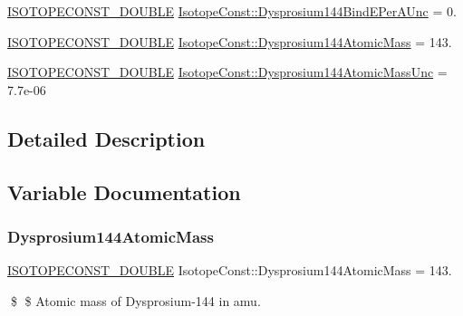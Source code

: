 \begin{DoxyCompactItemize}
\item 
\mbox{\hyperlink{group___isotope_const-_macros_ga8f45a7272ce02c0b4c65c44636ed719a}{I\+S\+O\+T\+O\+P\+E\+C\+O\+N\+S\+T\+\_\+\+D\+O\+U\+B\+LE}} \mbox{\hyperlink{group___isotope_const-_dysprosium-_dy144_gaa909bf4526c4543c20768688331f880a}{Isotope\+Const\+::\+Dysprosium144\+Bind\+E\+Per\+A\+Unc}} = 0.
\item 
\mbox{\hyperlink{group___isotope_const-_macros_ga8f45a7272ce02c0b4c65c44636ed719a}{I\+S\+O\+T\+O\+P\+E\+C\+O\+N\+S\+T\+\_\+\+D\+O\+U\+B\+LE}} \mbox{\hyperlink{group___isotope_const-_dysprosium-_dy144_gaa549cde5e767f696c38f311d13b79605}{Isotope\+Const\+::\+Dysprosium144\+Atomic\+Mass}} = 143.
\item 
\mbox{\hyperlink{group___isotope_const-_macros_ga8f45a7272ce02c0b4c65c44636ed719a}{I\+S\+O\+T\+O\+P\+E\+C\+O\+N\+S\+T\+\_\+\+D\+O\+U\+B\+LE}} \mbox{\hyperlink{group___isotope_const-_dysprosium-_dy144_ga456d8966d891aa4ee8eb29a285295bd0}{Isotope\+Const\+::\+Dysprosium144\+Atomic\+Mass\+Unc}} = 7.\+7e-\/06
\end{DoxyCompactItemize}


\subsection{Detailed Description}


\subsection{Variable Documentation}
\mbox{\label{group___isotope_const-_dysprosium-_dy144_gaa549cde5e767f696c38f311d13b79605}} 
\subsubsection{\texorpdfstring{Dysprosium144\+Atomic\+Mass}{Dysprosium144AtomicMass}}
{\footnotesize\ttfamily \mbox{\hyperlink{group___isotope_const-_macros_ga8f45a7272ce02c0b4c65c44636ed719a}{I\+S\+O\+T\+O\+P\+E\+C\+O\+N\+S\+T\+\_\+\+D\+O\+U\+B\+LE}} Isotope\+Const\+::\+Dysprosium144\+Atomic\+Mass = 143.}

\$ \$ Atomic mass of Dysprosium-\/144 in amu. \mbox{\label{group___isotope_const-_dysprosium-_dy144_ga456d8966d891aa4ee8eb29a285295bd0}} 
